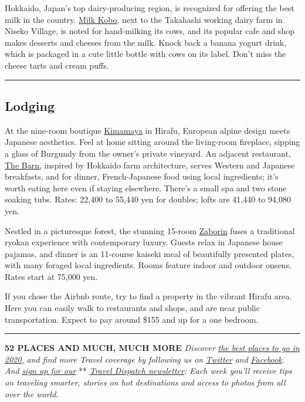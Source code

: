 Hokkaido, Japan's top dairy-producing region, is recognized for offering
the best milk in the country.
\href{http://www.niseko-takahashi.jp/milkkobo}{Milk Kobo}, next to the
Takahashi working dairy farm in Niseko Village, is noted for
hand-milking its cows, and its popular cafe and shop makes desserts and
cheeses from the milk. Knock back a banana yogurt drink, which is
packaged in a cute little bottle with cows on its label. Don't miss the
cheese tarts and cream puffs.

\begin{center}\rule{0.5\linewidth}{\linethickness}\end{center}

\hypertarget{lodging}{%
\subsection{Lodging}\label{lodging}}

At the nine-room boutique \href{http://kimamaya.com}{Kimamaya} in
Hirafu, European alpine design meets Japanese aesthetics. Feel at home
sitting around the living-room fireplace, sipping a glass of Burgundy
from the owner's private vineyard. An adjacent restaurant,
\href{http://www.nisekobarn.com/}{The Barn,} inspired by Hokkaido farm
architecture, serves Western and Japanese breakfasts, and for dinner,
French-Japanese food using local ingredients; it's worth eating here
even if staying elsewhere. There's a small spa and two stone soaking
tubs. Rates: 22,400 to 55,440 yen for doubles; lofts are 41,440 to
94,080 yen.

Nestled in a picturesque forest, the stunning 15-room
\href{http://zaborin.com/en/}{Zaborin} fuses a traditional ryokan
experience with contemporary luxury. Guests relax in Japanese house
pajamas, and dinner is an 11-course kaiseki meal of beautifully
presented plates, with many foraged local ingredients. Rooms feature
indoor and outdoor onsens. Rates start at 75,000 yen.

If you chose the Airbnb route, try to find a property in the vibrant
Hirafu area. Here you can easily walk to restaurants and shops, and are
near public transportation. Expect to pay around \$155 and up for a one
bedroom.

\begin{center}\rule{0.5\linewidth}{\linethickness}\end{center}

\textbf{52 PLACES AND MUCH, MUCH MORE} \emph{Discover}
\href{https://www.nytimes3xbfgragh.onion/interactive/2020/travel/places-to-visit.html}{\emph{the
best places to go in 2020,}} \emph{and find more Travel coverage by
following us on}
\href{https://twitter.com/nytimestravel}{\emph{Twitter}} \emph{and}
\href{https://www.facebookcorewwwi.onion/nytimestravel/}{\emph{Facebook}}\emph{.
And}
\href{https://www.nytimes3xbfgragh.onion/newsletters/traveldispatch?action=click\&module=inline\&pgtype=Article}{\emph{sign
up for our}} **
\href{https://www.nytimes3xbfgragh.onion/newsletters/traveldispatch}{\emph{Travel
Dispatch newsletter}}\emph{: Each week you'll receive tips on traveling
smarter, stories on hot destinations and access to photos from all over
the world.}

